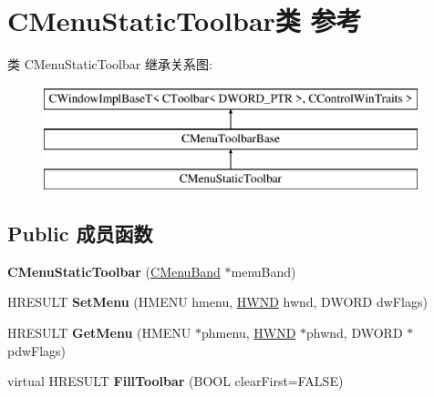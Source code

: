 \hypertarget{class_c_menu_static_toolbar}{}\section{C\+Menu\+Static\+Toolbar类 参考}
\label{class_c_menu_static_toolbar}
类 C\+Menu\+Static\+Toolbar 继承关系图\+:\begin{figure}[H]
\begin{center}
\leavevmode
\includegraphics[height=3.000000cm]{class_c_menu_static_toolbar}
\end{center}
\end{figure}
\subsection*{Public 成员函数}
\begin{DoxyCompactItemize}
\item 
\mbox{\label{class_c_menu_static_toolbar_a0b6d929153f981a0ed0e537829f181d0}} 
{\bfseries C\+Menu\+Static\+Toolbar} (\hyperlink{class_c_menu_band}{C\+Menu\+Band} $\ast$menu\+Band)
\item 
\mbox{\label{class_c_menu_static_toolbar_ab9be86d142ba4e8db192b497eff46ea9}} 
H\+R\+E\+S\+U\+LT {\bfseries Set\+Menu} (H\+M\+E\+NU hmenu, \hyperlink{interfacevoid}{H\+W\+ND} hwnd, D\+W\+O\+RD dw\+Flags)
\item 
\mbox{\label{class_c_menu_static_toolbar_a251a6cd129148d36b314af6df28a7e20}} 
H\+R\+E\+S\+U\+LT {\bfseries Get\+Menu} (H\+M\+E\+NU $\ast$phmenu, \hyperlink{interfacevoid}{H\+W\+ND} $\ast$phwnd, D\+W\+O\+RD $\ast$pdw\+Flags)
\item 
\mbox{\label{class_c_menu_static_toolbar_a3c657bd4827d20fb147329ef1e6a14e7}} 
virtual H\+R\+E\+S\+U\+LT {\bfseries Fill\+Toolbar} (B\+O\+OL clear\+First=F\+A\+L\+SE)
\end{DoxyCompactItemize}
